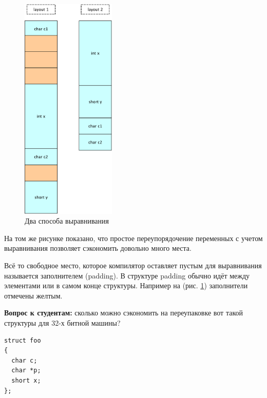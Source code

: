 \documentclass[a4paper,12pt,oneside]{article}
\newif\ifanswers
\begin{document}
\begin{figure}[h!]
\centering
\includegraphics[width=0.4\textwidth]{illustrations/alignment-crop.pdf}
\caption{Два способа выравнивания}
\label{fig:alignment}
\end{figure}

На том же рисунке показано, что простое переупорядочение переменных с учетом выравнивания позволяет сэкономить довольно много места.

Всё то свободное место, которое компилятор оставляет пустым для выравнивания называется заполнителем (padding). В структуре padding обычно идёт между элементами или в самом конце структуры. Например на (рис. \ref{fig:alignment}) заполнители отмечены желтым.

\textbf{Вопрос к студентам:} сколько можно сэкономить на переупаковке вот такой структуры для 32-х битной машины?

\begin{lstlisting}
struct foo
{
  char c;
  char *p;
  short x;
};
\end{lstlisting}

\ifanswers
Правильный ответ: переупаковка в нисходящем порядке

\begin{lstlisting}
struct foo 
{
  char *p;
  short x;
  char c;
};
\end{lstlisting}
\fi
\end{document}
